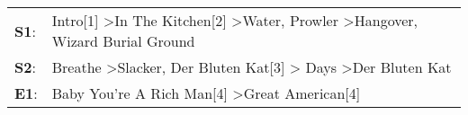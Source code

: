 \begin{supertabular}{p{0.03\textwidth}p{0.92\textwidth}}
 \textbf{S1}:  &  Intro[1]\textsuperscript{} \textgreater \enspace In The Kitchen[2]\textsuperscript{} \textgreater \enspace Water\textsuperscript{}, \enspace Prowler\textsuperscript{} \textgreater \enspace Hangover\textsuperscript{}, \enspace Wizard Burial Ground\textsuperscript{}  \enspace  \\
 \textbf{S2}:  &                                            Breathe\textsuperscript{} \textgreater \enspace Slacker\textsuperscript{}, \enspace Der Bluten Kat[3]\textsuperscript{} \textgreater {} Days\textsuperscript{} \textgreater \enspace Der Bluten Kat\textsuperscript{}  \enspace  \\
 \textbf{E1}:  &                                                                                                                                                                     Baby You're A Rich Man[4]\textsuperscript{} \textgreater \enspace Great American[4]\textsuperscript{}  \enspace  \\
\end{supertabular}
